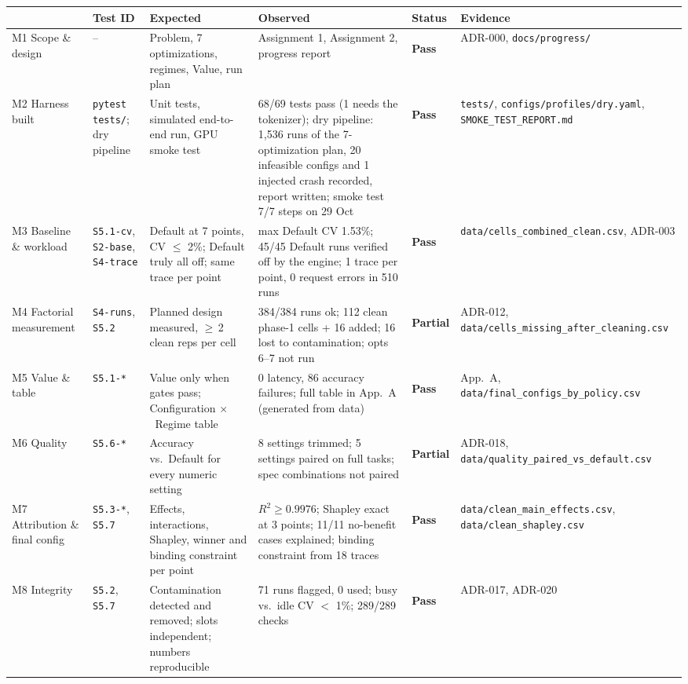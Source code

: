 \documentclass[10pt,a4paper]{article}
\newcommand{\hc}[1]{{\leavevmode\bfseries\color{ink}#1}}   %
\newcommand{\x}{\ensuremath{\times}}
\newcommand{\fp}[1]{{\leavevmode\urlstyle{tt}\color{codecol}\nolinkurl{#1}}}
\newcommand{\pill}[2]{\colorbox{#1}{\sffamily\footnotesize\strut #2}}
\newcommand{\pass}{\pill{passbg}{\textcolor{passgreen}{\textbf{Pass}}}}
\newcommand{\partl}{\pill{partbg}{\textbf{Partial}}}
\begin{document}
{\small
\setlength{\tabcolsep}{3pt}
\begin{longtable}{@{}P{2.0cm}P{2.0cm}P{3.3cm}P{4.5cm}P{1.2cm}P{2.3cm}@{}}
\toprule
\rowcolor{tblhead}\hc{Milestone} & \hc{Test ID} & \hc{Expected} & \hc{Observed} & \hc{Status} & \hc{Evidence} \\
\midrule\endhead
M1 Scope \& design & -- & Problem, 7 optimizations, regimes, Value, run plan & Assignment 1, Assignment 2, progress
report & \pass & ADR-000, \fp{docs/progress/} \\
 M2 Harness built & \texttt{pytest tests/}; dry pipeline & Unit tests, simulated end-to-end run, GPU
smoke test & 68/69 tests pass (1 needs the tokenizer); dry pipeline: 1,536 runs of the 7-optimization plan, 20
infeasible configs and 1 injected crash recorded, report written; smoke test 7/7 steps on 29 Oct & \pass &
\fp{tests/}, \fp{configs/profiles/dry.yaml}, \fp{SMOKE_TEST_REPORT.md} \\
M3 Baseline \& workload & \texttt{S5.1-cv}, \texttt{S2-base}, \texttt{S4-trace} & Default at 7 points, CV $\le$ 2\%;
Default truly all off; same trace per point & max Default CV 1.53\%; 45/45 Default runs verified off by the engine; 1
trace per point, 0 request errors in 510 runs & \pass & \fp{data/cells_combined_clean.csv}, ADR-003 \\
 M4 Factorial measurement & \texttt{S4-runs}, \texttt{S5.2} & Planned design measured, $\ge$\,2
clean reps per cell & 384/384 runs ok; 112 clean phase-1 cells + 16 added; 16 lost to contamination; opts 6--7 not
run & \partl & ADR-012, \fp{data/cells_missing_after_cleaning.csv} \\
M5 Value \& table & \texttt{S5.1-*} & Value only when gates pass; Configuration \x\ Regime table & 0 latency, 86
accuracy failures; full table in App.\ A (generated from data) & \pass & App.\ A,
\fp{data/final_configs_by_policy.csv} \\
 M6 Quality & \texttt{S5.6-*} & Accuracy vs.\ Default for every numeric setting & 8 settings
trimmed; 5 settings paired on full tasks; spec combinations not paired & \partl & ADR-018,
\fp{data/quality_paired_vs_default.csv} \\
M7 Attribution \& final config & \texttt{S5.3-*}, \texttt{S5.7} & Effects, interactions, Shapley, winner and binding
constraint per point & $R^2 \ge 0.9976$; Shapley exact at 3 points; 11/11 no-benefit cases explained; binding
constraint from 18 traces & \pass & \fp{data/clean_main_effects.csv}, \fp{data/clean_shapley.csv} \\
 M8 Integrity & \texttt{S5.2}, \texttt{S5.7} & Contamination detected and removed; slots
independent; numbers reproducible & 71 runs flagged, 0 used; busy vs.\ idle CV $<$ 1\%; 289/289 checks & \pass &
ADR-017, ADR-020 \\
\bottomrule
\end{longtable}}
\end{document}
